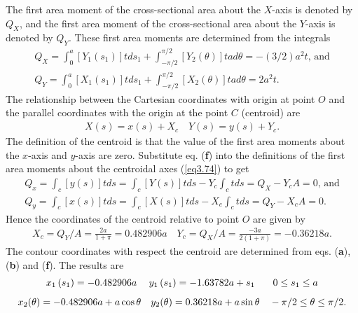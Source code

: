 \documentclass{AeroStructure-ERJohnson}
\begin{document}
\begin{example*}
The first area moment of the cross-sectional area about the $X$-axis is denoted by $Q_{X}$, and the first area moment of the cross-sectional area about the $Y$-axis is denoted by $Q_{Y}$. These first area moments are determined from the integrals
\begin{gather}
Q_{X}=\int_{0}^{a}\left[Y_{1}\left(s_{1}\right)\right] t d s_{1}+\int_{-\pi / 2}^{\pi / 2}\left[Y_{2}(\theta)\right] t a d \theta=-(3 / 2) a^{2} t\mbox{, and}\label{ex3.1d}\\
Q_{Y}=\int_{0}^{a}\left[X_{1}\left(s_{1}\right)\right] t d s_{1}+\int_{-\pi / 2}^{\pi / 2}\left[X_{2}(\theta)\right] t a d \theta=2 a^{2} t.\label{ex3.1e}
\end{gather}
The relationship between the Cartesian coordinates with origin at point $O$ and the parallel coordinates with the origin at the point $C$ (centroid) are
\begin{align}\label{ex3.1f}
X(s)=x(s)+X_{c} \quad Y(s)=y(s)+Y_{c}.
\end{align}
The definition of the centroid is that the value of the first area moments about the $x$-axis and $y$-axis are zero. Substitute eq. (\textbf{f}) into the definitions of the first area moments about the centroidal axes (\ref{eq3.74}) to get
\begin{gather}
Q_{x}=\int_{c}[y(s)] t d s=\int_{c}[Y(s)] t d s-Y_{c} \int_{c} t d s=Q_{X}-Y_{c} A=0\mbox{, and}\label{ex3.1g}\\
Q_{y}=\int_{c}[x(s)] t d s=\int_{c}[X(s)] t d s-X_{c} \int_c t d s=Q_{Y}-X_{c} A=0.\label{ex3.1h}
\end{gather}
Hence the coordinates of the centroid relative to point $O$ are given by
\begin{align}\label{ex3.1i}
X_{c}=Q_{Y} / A=\frac{2 a}{1+\pi}=0.482906 a \quad Y_{c}=Q_{X} / A=\frac{-3 a}{2(1+\pi)}=-0.36218 a.
\end{align}
The contour coordinates with respect the centroid are determined from eqs. (\textbf{a}), (\textbf{b}) and (\textbf{f}). The results are
\begin{gather}
x_{1}\left(s_{1}\right)=-0.482906 a \quad\hspace*{2.5pt} y_{1}\left(s_{1}\right)=-1.63782 a+s_{1} \quad\hspace*{8.5pt} 0 \leq s_{1} \leq a\label{ex3.1j}\\[5pt]
x_{2}(\theta)=-0.482906 a+a \cos \theta \quad y_{2}(\theta)=0.36218 a+a \sin \theta \quad-\pi / 2 \leq \theta \leq \pi / 2.\label{ex3.1k}
\end{gather}


\end{example*}
\end{document}
